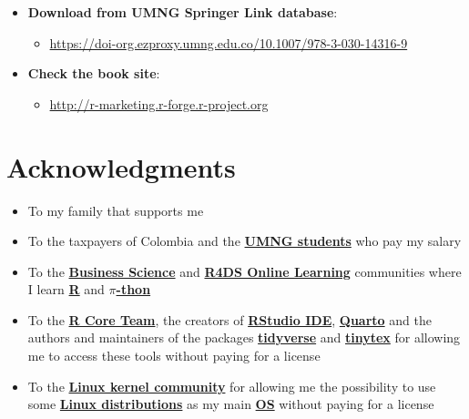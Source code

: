 \documentclass[
  ignorenonframetext,
]{beamer}
\providecommand{\tightlist}{%
  \setlength{\itemsep}{0pt}\setlength{\parskip}{0pt}}\usepackage{longtable,booktabs,array}
\begin{document}
\begin{frame}{}
\label{section-13}
\begin{itemize}
\item
  \textbf{Download from UMNG Springer Link database}:

  \begin{itemize}
  \tightlist
  \item
    \url{https://doi-org.ezproxy.umng.edu.co/10.1007/978-3-030-14316-9}
  \end{itemize}
\item
  \textbf{Check the book site}:

  \begin{itemize}
  \tightlist
  \item
    \url{http://r-marketing.r-forge.r-project.org}
  \end{itemize}
\end{itemize}
\end{frame}

\section{Acknowledgments}\label{acknowledgments}

\begin{frame}{}
\label{section-14}
\begin{itemize}
\item
  To my family that supports me
\item
  To the taxpayers of Colombia and the
  \href{https://www.umng.edu.co/estudiante}{\textbf{UMNG students}} who
  pay my salary
\item
  To the \href{https://www.business-science.io/}{\textbf{Business
  Science}} and \href{https://www.rfordatasci.com/}{\textbf{R4DS Online
  Learning}} communities where I learn
  \href{https://www.r-project.org/about.html}{\textbf{R}} and
  \href{https://www.python.org/about/}{\textbf{\(\pi\)-thon}}
\item
  To the \href{https://www.r-project.org/contributors.html}{\textbf{R
  Core Team}}, the creators of
  \href{https://posit.co/products/open-source/rstudio/}{\textbf{RStudio
  IDE}}, \href{https://quarto.org/}{\textbf{Quarto}} and the authors and
  maintainers of the packages
  \href{https://CRAN.R-project.org/package=tidyverse}{\textbf{tidyverse}}
  and
  \href{https://CRAN.R-project.org/package=tinytex}{\textbf{tinytex}}
  for allowing me to access these tools without paying for a license
\item
  To the \href{https://www.kernel.org/category/about.html}{\textbf{Linux
  kernel community}} for allowing me the possibility to use some
  \href{https://static.lwn.net/Distributions/}{\textbf{Linux
  distributions}} as my main
  \href{https://en.wikipedia.org/wiki/Operating_system}{\textbf{OS}}
  without paying for a license
\end{itemize}
\end{frame}
\end{document}
